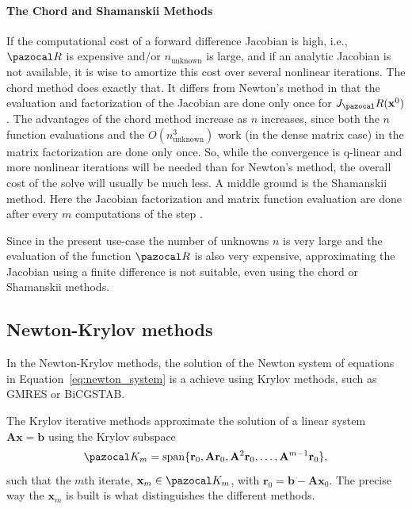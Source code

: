 \paragraph{The Chord and Shamanskii Methods}

If the computational cost of a forward difference Jacobian is high, i.e., \(\pazocal R\) is expensive and/or \(n_\text{unknown}\) is large, and if an analytic Jacobian is not available, it is wise to amortize this cost over several nonlinear iterations.
The chord method does exactly that.
It differs from Newton's method in that the evaluation and factorization of the Jacobian are done only once for \(J_\pazocal R(\mathbf x^0)\).
The advantages of the chord method increase as \(n\) increases, since both the \(n\) function evaluations and the \(O(n_\text{unknown}^{3})\) work (in the dense matrix case) in the matrix factorization are done only once.
So, while the convergence is q-linear and more nonlinear iterations will be needed than for Newton's method, the overall cost of the solve will usually be much less.
A middle ground is the Shamanskii method.
Here the Jacobian factorization and matrix function evaluation are done after every \(m\) computations of the step \citep{kelley_solving_2003}.

Since in the present use-case the number of unknowns \(n\) is very large and the evaluation of the function \(\pazocal R\) is also very expensive, approximating the Jacobian using a finite difference is not suitable, even using the chord or Shamanskii methods.


\subsection{Newton-Krylov methods}

In the Newton-Krylov methods, the solution of the Newton system of equations in Equation~\eqref{eq:newton_system} is a achieve using Krylov methods, such as GMRES or BiCGSTAB.

The Krylov iterative methods approximate the solution of a linear system \(\mathbf A \mathbf x = \mathbf b\) using the Krylov subspace
\begin{equation}
  \pazocal K_m = \operatorname{span}\{\mathbf r_0, \mathbf A\mathbf r_0, \mathbf A^2 \mathbf r_0, \dots, \mathbf A^{m-1}\mathbf r_0\},
\end{equation}
such that the \(m\)th iterate, \(\mathbf x_m\in \pazocal K_m\), with \(\mathbf r_0 = \mathbf b - \mathbf A \mathbf x_0\).
The precise way the \(\mathbf x_m\) is built is what distinguishes the different methods.

